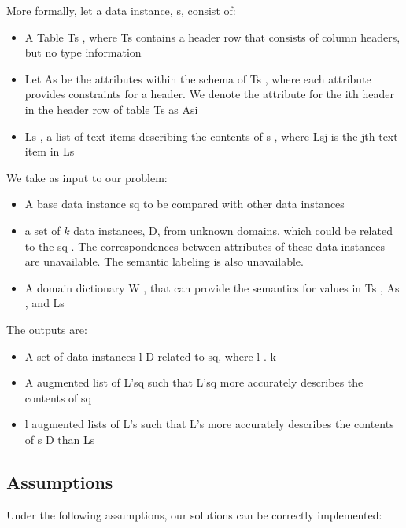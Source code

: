 More formally, let a data instance, s, consist of:
\begin{itemize}
\item A Table Ts , where Ts contains a header row that consists of column headers, but no type information
\item Let As be the attributes within the schema of Ts , where each attribute provides constraints for a header. We denote the attribute for the ith header in the header row of table Ts as Asi
\item Ls , a list of text items describing the contents of s , where Lsj is the jth text item in Ls
\end{itemize}
We take as input to our problem:
\begin{itemize}
\item A base data instance sq to be compared with other data instances
\item a set of $k$ data instances, D, from unknown domains, which could be related to the sq . The correspondences between attributes of these data instances are unavailable. The semantic labeling is also unavailable.
\item A domain dictionary W , that can provide the semantics for values in Ts , As , and Ls
\end{itemize}
The outputs are:
\begin{itemize}
\item A set of data instances l  D related to sq, where l . k
\item A augmented list of L'sq such that L'sq more accurately describes the contents of sq
\item l augmented lists of L's such that L's more accurately describes the contents of s  D than Ls
\end{itemize}

\subsection{Assumptions}

Under the following assumptions, our solutions can be correctly implemented:

